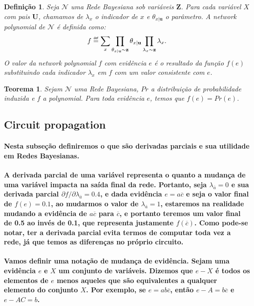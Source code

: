 \documentclass[a4paper,10pt]{article}
\newcommand\defeq{\mathrel{\overset{\makebox[0pt]{\mbox{\normalfont\tiny\sffamily def}}}{=}}}
\theoremstyle{plain}
\newtheorem*{spn-def}{Definição}
\newtheorem*{spn-thm}{Teorema}
\begin{document}
\begin{spn-def} Seja $\mathcal{N}$ uma Rede Bayesiana sob variáveis $\mathbf{Z}$. Para cada 
variável $X$ com pais $\mathbf{U}$, chamamos de $\lambda_x$ o indicador de $x$ e 
$\theta_{x|\textbf{u}}$ o parâmetro. A \textit{network polynomial} de $\mathcal{N}$ é definida como:
\begin{equation}
f \defeq \sum_x \prod_{\theta_{x|\textbf{u}} \sim \textbf{z}} \theta_{x|\textbf{u}} \prod_{\lambda_x \sim \textbf{z}} \lambda_x.
\end{equation}
O valor da \textit{network polynomial} $f$ com evidência $e$ é o resultado da função $f(e)$ 
substituindo cada indicador $\lambda_x$ em $f$ com um valor consistente com $e$.
\end{spn-def}

\begin{spn-thm} Sejam $\mathcal{N}$ uma Rede Bayesiana, $Pr$ a distribuição de probabilidade
induzida e $f$ a \textit{polynomial}. Para toda evidência $e$, temos que $f(e)=Pr(e)$.
\end{spn-thm}

\subsection{Circuit propagation}

\paragraph{
  Nesta subseção definiremos o que são derivadas parciais e sua utilidade em Redes Bayesianas.
}

\paragraph{
  A derivada parcial de uma variável representa o quanto a mudança de uma variável impacta na saída
final da rede. Portanto, seja $\lambda_{\overline{a}}=0$ e sua derivada parcial
$\partial{f}/\partial{\lambda_{\overline{a}}} = 0.4$, e dada evidência $e=a\overline{c}$ e seja o
valor final de $f(e)=0.1$, ao mudarmos o valor de $\lambda_{\overline{a}}=1$, estaremos na realidade
mudando a evidência de $a\overline{c}$ para $\overline{c}$, e portanto teremos um valor final de
0.5 ao invés de 0.1, que representa justamente $f(\overline{c})$. Como pode-se notar, ter a 
derivada parcial evita termos de computar toda vez a rede, já que temos as diferenças no próprio
circuito.
}

\paragraph{
  Vamos definir uma notação de mudança de evidência. Sejam uma evidência $e$ e $X$ um conjunto
de variáveis. Dizemos que $e-X$ é todos os elementos de $e$ menos aqueles que são equivalentes a
qualquer elemento do conjunto $X$. Por exemplo, se $e=ab\overline{c}$, então $e-A=b\overline{c}$
e $e-AC=b$.
}
\end{document}
